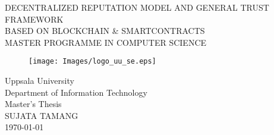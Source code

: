 
\thispagestyle{empty}

\vspace*{+5em}
\begin{center}
DECENTRALIZED REPUTATION MODEL AND GENERAL TRUST FRAMEWORK\\
BASED ON BLOCKCHAIN \& SMARTCONTRACTS \\
\vspace*{+8em}
\vspace{+2em}
MASTER PROGRAMME IN COMPUTER SCIENCE\\

\vspace*{+3em}
\begin{figure}[H]
\centering
\texttt{[image: Images/logo\_uu\_se.eps]}
\end{figure}

\vspace*{+3em}
Uppsala University\\
Department of Information Technology\\
\vspace*{+2em}
Master's Thesis \\
SUJATA TAMANG\\

\vspace*{+12em}
\today
\end{center}
